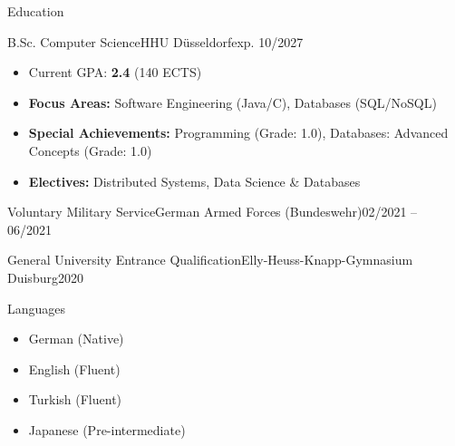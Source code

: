 \documentclass[]{mcdowellcv}
\begin{document}
    \begin{cvsection}{Education}
        \begin{cvsubsection}{B.Sc. Computer Science}{HHU Düsseldorf}{exp. 10/2027}
            \begin{itemize}
                \item Current GPA: \textbf{2.4} (140 ECTS)
                \item \textbf{Focus Areas:} Software Engineering (Java/C), Databases (SQL/NoSQL)
                \item \textbf{Special Achievements:} Programming (Grade: 1.0), Databases: Advanced Concepts (Grade: 1.0)
                \item \textbf{Electives:} Distributed Systems, Data Science \& Databases
            \end{itemize}
        \end{cvsubsection}
        
        \vspace{0.15cm}
        
        \begin{cvsubsection}{Voluntary Military Service}{German Armed Forces (Bundeswehr)}{02/2021 -- 06/2021}
        \end{cvsubsection}
        
        \vspace{0.15cm}
        
        \begin{cvsubsection}{General University Entrance Qualification}{Elly-Heuss-Knapp-Gymnasium Duisburg}{2020}
        \end{cvsubsection}
    \end{cvsection}

    \vspace{0.25cm}

    \begin{cvsection}{Languages}
        \begin{cvsubsection}{}{}{}     
            \begin{itemize}
                \item German (Native)
                \item English (Fluent)
                \item Turkish (Fluent)
                \item Japanese (Pre-intermediate)
            \end{itemize}
        \end{cvsubsection}
    \end{cvsection}
    
\end{document}
